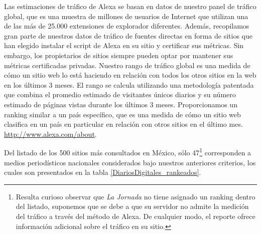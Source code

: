 \documentclass[letterpaper, 11pt]{book}
\theoremstyle{definition}
\theoremstyle{remark}
\begin{document}
\begin{center}
    \begin{minipage}{0.9\linewidth}
        {\setlength{\parindent}{12pt}\small
	    Las estimaciones de tráfico de Alexa se basan en datos de nuestro panel de tráfico global, que es una muestra de millones de usuarios de Internet que utilizan una de las más de 25.000 extensiones de explorador diferentes. 
	    Además, recopilamos gran parte de nuestros datos de tráfico de fuentes directas en forma de sitios que han elegido instalar el script de Alexa en su sitio y certificar sus métricas. 
	    Sin embargo, los propietarios de sitios siempre pueden optar por mantener sus métricas certificadas privadas.
	    Nuestro rango de tráfico global es una medida de cómo un sitio web lo está haciendo en relación con todos los otros sitios en la web en los últimos 3 meses. 
	    El rango se calcula utilizando una metodología patentada que combina el promedio estimado de visitantes únicos diarios y su número estimado de páginas vistas durante los últimos 3 meses. 
	    Proporcionamos un ranking similar a un país específico, que es una medida de cómo un sitio web clasifica en un país en particular en relación con otros sitios en el último mes.  \normalsize \url{http://www.alexa.com/about}.
        }
    \end{minipage}
\end{center}

Del listado de los 500 sitios más consultados en México, sólo 47\footnote{Resulta curioso observar que \emph{La Jornada} no tiene asignado un ranking dentro del listado, suponemos que se debe a que su servidor no admite la medición del tráfico a través del método de Alexa. De cualquier modo, el reporte \citet{2016_INE_catalogoMedios} ofrece información adicional sobre el tráfico en su sitio.} corresponden a medios periodísticos nacionales considerados bajo nuestros anteriores criterios, los cuales son presentados en la tabla \ref{DiariosDigitales_rankeados}.
\end{document}

